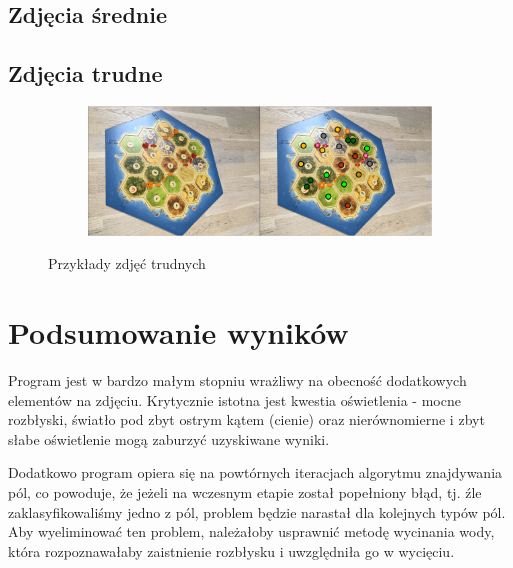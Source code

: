 \documentclass[a4paper]{article}
\begin{document}
    \subsection{Zdjęcia średnie}
    \subsection{Zdjęcia trudne}
    \begin{figure}[H]
        \begin{subfigure}[]{\linewidth}
            \includegraphics[width=\linewidth]{pictures/hard1.png}
        \end{subfigure}

        \caption{Przykłady zdjęć trudnych}
        \label{fig:hard}
    \end{figure}
\section{Podsumowanie wyników}
	Program jest w bardzo małym stopniu wrażliwy na obecność dodatkowych elementów na zdjęciu. Krytycznie istotna jest kwestia oświetlenia - mocne rozbłyski, światło pod zbyt ostrym kątem (cienie) oraz nierównomierne i zbyt słabe oświetlenie mogą zaburzyć uzyskiwane wyniki. 
	
	Dodatkowo program opiera się na powtórnych iteracjach algorytmu znajdywania pól, co powoduje, że jeżeli na wczesnym etapie został popełniony błąd, tj. źle zaklasyfikowaliśmy jedno z pól, problem będzie narastał dla kolejnych typów pól. Aby wyeliminować ten problem, należałoby usprawnić metodę wycinania wody, która rozpoznawałaby zaistnienie rozbłysku i uwzględniła go w wycięciu.
	
\end{document}
